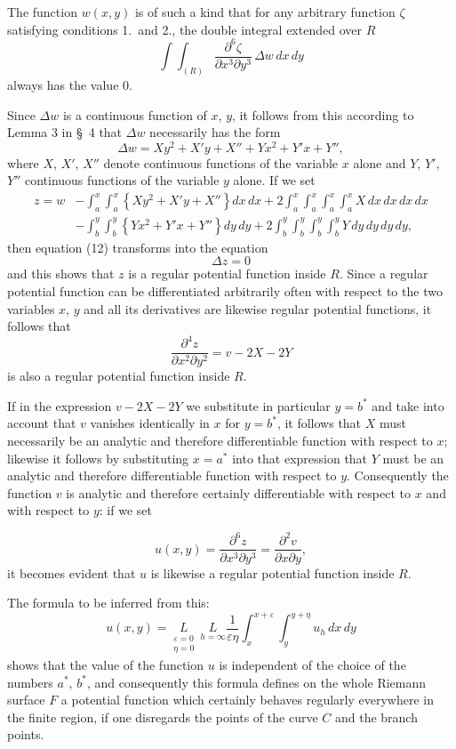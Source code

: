 \documentclass{article}
\begin{document}
The function $w(x, y)$ is of such a kind that for any arbitrary function $\zeta$ satisfying conditions 1.\ and 2., the double integral extended over $R$
\[
\int\!\!\int_{(R)} \frac{\partial^6\zeta}{\partial x^3 \partial y^3}\,\Delta w\,dx\,dy
\]
always has the value 0.

Since $\Delta w$ is a continuous function of $x$, $y$, it follows from this according to Lemma 3 in §~4 that $\Delta w$ necessarily has the form
\[
\Delta w = Xy^2 + X'y + X'' + Yx^2 + Y'x + Y'', \tag{12}
\]
where $X$, $X'$, $X''$ denote continuous functions of the variable $x$ alone and $Y$, $Y'$, $Y''$ continuous functions of the variable $y$ alone. If we set
\[
\begin{aligned}
z = w &- \int_a^x \int_a^x \left\{ Xy^2 + X'y + X'' \right\} dx\,dx + 2 \int_a^x \int_a^x \int_a^x \int_a^x X\,dx\,dx\,dx\,dx \\
&- \int_b^y \int_b^y \left\{ Yx^2 + Y'x + Y'' \right\} dy\,dy + 2 \int_b^y \int_b^y \int_b^y \int_b^y Y\,dy\,dy\,dy\,dy,
\end{aligned}
\]
then equation (12) transforms into the equation
\[
\Delta z = 0
\]
and this shows that $z$ is a regular potential function inside $R$. Since a regular potential function can be differentiated arbitrarily often with respect to the two variables $x$, $y$ and all its derivatives are likewise regular potential functions, it follows that
\[
\frac{\partial^4 z}{\partial x^2 \partial y^2} = v - 2X - 2Y
\]
is also a regular potential function inside $R$.

If in the expression $v - 2X - 2Y$ we substitute in particular $y = b^*$ and take into account that $v$ vanishes identically in $x$ for $y = b^*$, it follows that $X$ must necessarily be an analytic and therefore differentiable function with respect to $x$; likewise it follows by substituting $x = a^*$ into that expression that $Y$ must be an analytic and therefore differentiable function with respect to $y$. Consequently the function $v$ is analytic and therefore certainly differentiable with respect to $x$ and with respect to $y$: if we set

\[
u(x, y) = \frac{\partial^6 z}{\partial x^3 \partial y^3} = \frac{\partial^2 v}{\partial x \partial y},
\]
it becomes evident that $u$ is likewise a regular potential function inside $R$.

The formula to be inferred from this:
\[
u(x, y) = \underset{\substack{\varepsilon=0 \\ \eta=0}}{L} \ \underset{h=\infty}{L} \frac{1}{\varepsilon\eta} \int_x^{x+\varepsilon} \int_y^{y+\eta} u_h\,dx\,dy
\]
shows that the value of the function $u$ is independent of the choice of the numbers $a^*$, $b^*$, and consequently this formula defines on the whole Riemann surface $F$ a potential function which certainly behaves regularly everywhere in the finite region, if one disregards the points of the curve $C$ and the branch points.
\end{document}
